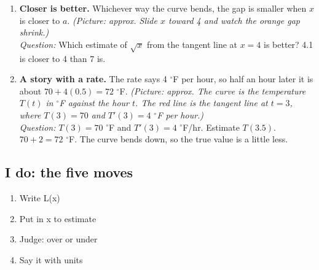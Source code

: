 \documentclass[11pt]{article}
\begin{document}
\begin{enumerate}
\item \textbf{Closer is better.} Whichever way the curve bends, the gap is smaller when $x$ is closer to $a$. \textit{(Picture: approx. Slide $x$ toward 4 and watch the orange gap shrink.)}\\ \textit{Question:} Which estimate of $\sqrt{x}$ from the tangent line at $x=4$ is better?  4.1 is closer to 4 than 7 is.
\item \textbf{A story with a rate.} The rate says 4 $^\circ$F per hour, so half an hour later it is about $70+4(0.5)=72$ $^\circ$F. \textit{(Picture: approx. The curve is the temperature $T(t)$ in $^\circ$F against the hour $t$. The red line is the tangent line at $t=3$, where $T(3)=70$ and $T'(3)=4$ $^\circ$F per hour.)}\\ \textit{Question:} $T(3)=70$ $^\circ$F and $T'(3)=4$ $^\circ$F/hr. Estimate $T(3.5)$.  $70+2=72$ $^\circ$F. The curve bends down, so the true value is a little less.
\end{enumerate}
\subsection*{I do: the five moves}\begin{enumerate}\item Write L(x)
\item Put in x to estimate
\item Judge: over or under
\item Say it with units\end{enumerate}
\end{document}
